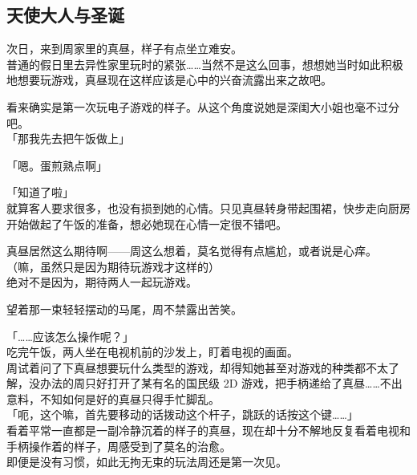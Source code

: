 \subsection{天使大人与圣诞}

次日，来到周家里的真昼，样子有点坐立难安。\\

普通的假日里去异性家里玩时的紧张……当然不是这么回事，想想她当时如此积极地想要玩游戏，真昼现在这样应该是心中的兴奋流露出来之故吧。

看来确实是第一次玩电子游戏的样子。从这个角度说她是深闺大小姐也毫不过分吧。\\

「那我先去把午饭做上」

「嗯。蛋煎熟点啊」

「知道了啦」\\

就算客人要求很多，也没有损到她的心情。只见真昼转身带起围裙，快步走向厨房开始做起了午饭的准备，想必她现在心情一定很不错吧。

真昼居然这么期待啊——周这么想着，莫名觉得有点尴尬，或者说是心痒。\\

（嘛，虽然只是因为期待玩游戏才这样的）\\

绝对不是因为，期待两人一起玩游戏。

望着那一束轻轻摆动的马尾，周不禁露出苦笑。\\

\vspace{2\baselineskip}

「……应该怎么操作呢？」\\

吃完午饭，两人坐在电视机前的沙发上，盯着电视的画面。\\

周试着问了下真昼想要玩什么类型的游戏，却得知她甚至对游戏的种类都不太了解，没办法的周只好打开了某有名的国民级 2D 游戏，把手柄递给了真昼……不出意料，不知如何是好的真昼只得手忙脚乱。\\

「呃，这个嘛，首先要移动的话拨动这个杆子，跳跃的话按这个键……」\\

看着平常一直都是一副冷静沉着的样子的真昼，现在却十分不解地反复看着电视和手柄操作着的样子，周感受到了莫名的治愈。\\

即便是没有习惯，如此无拘无束的玩法周还是第一次见。\\


